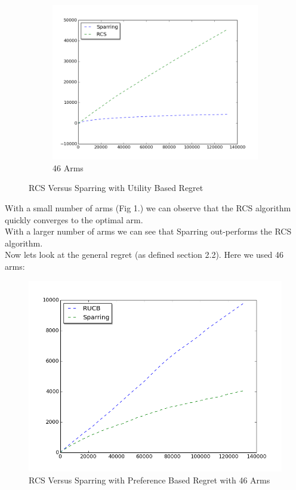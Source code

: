 \documentclass{llncs}
\begin{document}
\begin{figure}[h!]
\begin{subfigure}{.5\textwidth}
  \centering
  \includegraphics[scale=0.3, natwidth=410,natheight=442]{figures/rcs_sparring_MQ2007_46arms.png}
  \caption{46 Arms}
  \label{fig:sub2}
\end{subfigure}
\caption{RCS Versus Sparring with Utility Based Regret}
\label{fig:test}
\end{figure}


With a small number of arms (Fig 1.) we can observe that the RCS algorithm quickly converges to the optimal arm.
\\
With a larger number of arms we can see that Sparring out-performs the RCS algorithm. 
\\
Now lets look at the general regret (as defined section 2.2). Here we used 46 arms:
\begin{figure}[h!]
  \centering
     \includegraphics[scale=0.4, natwidth=410,natheight=442]{figures/rcs_sparring_MQ2007_general.png} 
  \caption{RCS Versus Sparring with Preference Based Regret with 46 Arms}
\end{figure}
\end{document}
